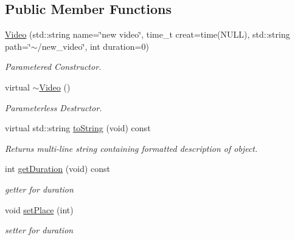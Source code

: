 \subsection*{Public Member Functions}
\begin{DoxyCompactItemize}
\item 
\hypertarget{classVideo_ad0277d8e5772008e22ac2948e03e103b}{\hyperlink{classVideo_ad0277d8e5772008e22ac2948e03e103b}{Video} (std\-::string name=\char`\"{}new video\char`\"{}, time\-\_\-t creat=time(N\-U\-L\-L), std\-::string path=\char`\"{}$\sim$/new\-\_\-video\char`\"{}, int duration=0)}\label{classVideo_ad0277d8e5772008e22ac2948e03e103b}

\begin{DoxyCompactList}\small\item\em Parametered Constructor. \end{DoxyCompactList}\item 
virtual \hyperlink{classVideo_aebf7e2a8fa2bbd79335b1cf35925d190}{$\sim$\-Video} ()
\begin{DoxyCompactList}\small\item\em Parameterless Destructor. \end{DoxyCompactList}\item 
\hypertarget{classVideo_af09cd9142969d63b514a251769fbed86}{virtual std\-::string \hyperlink{classVideo_af09cd9142969d63b514a251769fbed86}{to\-String} (void) const }\label{classVideo_af09cd9142969d63b514a251769fbed86}

\begin{DoxyCompactList}\small\item\em Returns multi-\/line string containing formatted description of object. \end{DoxyCompactList}\item 
\hypertarget{classVideo_a1a495dbb8b0389e092758c62144ebc45}{int \hyperlink{classVideo_a1a495dbb8b0389e092758c62144ebc45}{get\-Duration} (void) const }\label{classVideo_a1a495dbb8b0389e092758c62144ebc45}

\begin{DoxyCompactList}\small\item\em getter for duration \end{DoxyCompactList}\item 
\hypertarget{classVideo_a5accd8b8a418f0216bf45659a8050d3d}{void \hyperlink{classVideo_a5accd8b8a418f0216bf45659a8050d3d}{set\-Place} (int)}\label{classVideo_a5accd8b8a418f0216bf45659a8050d3d}

\begin{DoxyCompactList}\small\item\em setter for duration \end{DoxyCompactList}\end{DoxyCompactItemize}


